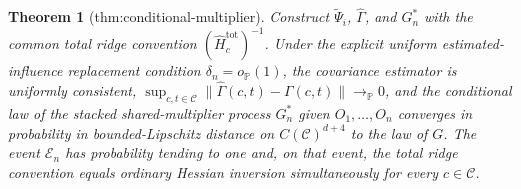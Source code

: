 \documentclass{article}
\newtheorem{theorem}{Theorem}
\begin{document}
\begin{theorem}[thm:conditional-multiplier]\label{thm:conditional-multiplier}
Construct \(\widetilde\Psi_i\), \(\widehat\Gamma\), and \(G_n^*\) with the common total ridge convention \((\widehat H_c^{\mathrm{tot}})^{-1}\). Under the explicit uniform estimated-influence replacement condition \(\delta_n=o_{\mathbb P}(1)\), the covariance estimator is uniformly consistent, \(\sup_{c,t\in\mathcal C}\|\widehat\Gamma(c,t)-\Gamma(c,t)\|\to_{\mathbb P}0\), and the conditional law of the stacked shared-multiplier process \(G_n^*\) given \(O_1,\ldots,O_n\) converges in probability in bounded-Lipschitz distance on \(C(\mathcal C)^{d+4}\) to the law of \(G\). The event \(\mathcal E_n\) has probability tending to one and, on that event, the total ridge convention equals ordinary Hessian inversion simultaneously for every \(c\in\mathcal C\).
\end{theorem}
\end{document}
